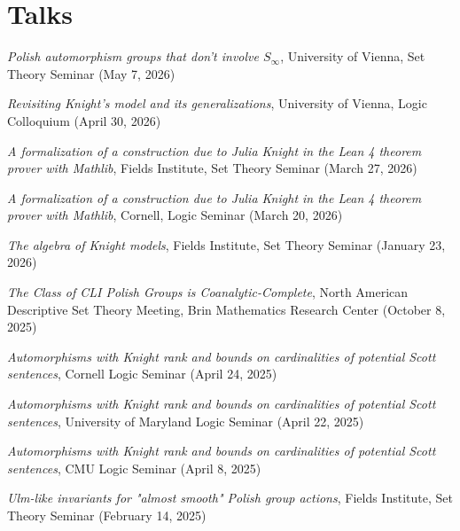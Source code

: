 \documentclass[letterpaper]{article}
\renewenvironment{itemize}{
  \begin{list}{}{
    \setlength{\leftmargin}{1.5em}
  }
}{
  \end{list}
}
\begin{document}

\section*{Talks}

\begin{itemize}

    \item \emph{Polish automorphism groups that don't involve $S_\infty$}, University of Vienna, Set Theory Seminar (May 7, 2026)
    
    \item \emph{Revisiting Knight's model and its generalizations}, University of Vienna, Logic Colloquium (April 30, 2026)

    \item \emph{A formalization of a construction due to Julia Knight in the Lean 4 theorem prover with Mathlib}, Fields Institute, Set Theory Seminar (March 27, 2026)

    \item \emph{A formalization of a construction due to Julia Knight in the Lean 4 theorem prover with Mathlib}, Cornell, Logic Seminar (March 20, 2026)

    \item \emph{The algebra of Knight models}, Fields Institute, Set Theory Seminar (January 23, 2026)

    \item \emph{The Class of CLI Polish Groups is Coanalytic-Complete}, North American Descriptive Set Theory Meeting, Brin Mathematics Research Center (October 8, 2025)

    \item \emph{Automorphisms with Knight rank and bounds on cardinalities of potential Scott sentences}, Cornell Logic Seminar (April 24, 2025)

    \item \emph{Automorphisms with Knight rank and bounds on cardinalities of potential Scott sentences}, University of Maryland Logic Seminar (April 22, 2025)

    \item \emph{Automorphisms with Knight rank and bounds on cardinalities of potential Scott sentences}, CMU Logic Seminar (April 8, 2025)

    \item \emph{Ulm-like invariants for "almost smooth" Polish group actions}, Fields Institute, Set Theory Seminar (February 14, 2025)
    

\end{itemize}
\end{document}
